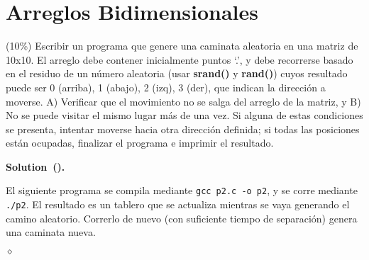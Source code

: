 \documentclass{article}
\theoremstyle{problemstyle}
\newenvironment{solution}[2]{%
  \begin{mdframed}[linewidth=0.8pt,linecolor=Gray,backgroundcolor=Gray!5,roundcorner=5pt, nobreak=#2]%
    \noindent\textbf{Solution\if\relax\detokenize{#1}\relax\else~(#1)\fi.}%
}{%
\hfill $ \diamond $ 
  \end{mdframed}%
}
\begin{document}
\section*{Arreglos Bidimensionales}\label{sec:arreglos_bidimensionales} %
\begin{problem}
(10\%) Escribir un programa que genere una caminata aleatoria en una matriz de 10x10. El arreglo debe contener inicialmente puntos `.', y debe recorrerse basado en el residuo de un n\'umero aleatoria (usar \textbf{srand()} y \textbf{rand()}) cuyos resultado puede ser {0 (arriba), 1 (abajo), 2 (izq), 3 (der)}, que indican la direcci\'on a moverse. A) Verificar que el movimiento no se salga del arreglo de la matriz, y B) No se puede visitar el mismo lugar más de una vez. Si alguna de estas condiciones se presenta, intentar moverse hacia otra direcci\'on definida; si todas las posiciones están ocupadas, finalizar el programa e imprimir el resultado.
\end{problem}

\begin{solution}{}{false}
  El siguiente programa se compila mediante \texttt{gcc p2.c -o p2}, y se corre mediante \texttt{./p2}. El resultado es un tablero que se actualiza mientras se vaya generando el camino aleatorio. Correrlo de nuevo (con suficiente tiempo de separaci\'on) genera una caminata nueva.
	
\end{solution}
\end{document}
